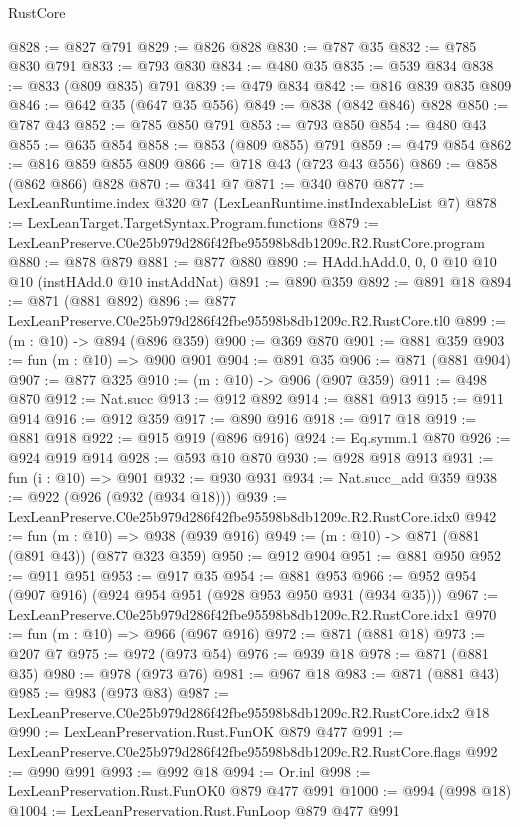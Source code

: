 \begin{lexlean}{RustCore}
\begin{coremodule}
@828 := @827 @791
@829 := @826 @828
@830 := @787 @35
@832 := @785 @830 @791
@833 := @793 @830
@834 := @480 @35
@835 := @539 @834
@838 := @833 (@809 @835) @791
@839 := @479 @834
@842 := @816 @839 @835 @809
@846 := @642 @35 (@647 @35 @556)
@849 := @838 (@842 @846) @828
@850 := @787 @43
@852 := @785 @850 @791
@853 := @793 @850
@854 := @480 @43
@855 := @635 @854
@858 := @853 (@809 @855) @791
@859 := @479 @854
@862 := @816 @859 @855 @809
@866 := @718 @43 (@723 @43 @556)
@869 := @858 (@862 @866) @828
@870 := @341 @7
@871 := @340 @870
@877 := LexLeanRuntime.index @320 @7 (LexLeanRuntime.instIndexableList @7)
@878 := LexLeanTarget.TargetSyntax.Program.functions
@879 := LexLeanPreserve.C0e25b979d286f42fbe95598b8db1209c.R2.RustCore.program
@880 := @878 @879
@881 := @877 @880
@890 := HAdd.hAdd.{0, 0, 0} @10 @10 @10 (instHAdd.{0} @10 instAddNat)
@891 := @890 @359
@892 := @891 @18
@894 := @871 (@881 @892)
@896 := @877 LexLeanPreserve.C0e25b979d286f42fbe95598b8db1209c.R2.RustCore.tl0
@899 := (m : @10) -> @894 (@896 @359)
@900 := @369 @870
@901 := @881 @359
@903 := fun (m : @10) => @900 @901
@904 := @891 @35
@906 := @871 (@881 @904)
@907 := @877 @325
@910 := (m : @10) -> @906 (@907 @359)
@911 := @498 @870
@912 := Nat.succ
@913 := @912 @892
@914 := @881 @913
@915 := @911 @914
@916 := @912 @359
@917 := @890 @916
@918 := @917 @18
@919 := @881 @918
@922 := @915 @919 (@896 @916)
@924 := Eq.symm.{1} @870
@926 := @924 @919 @914
@928 := @593 @10 @870
@930 := @928 @918 @913
@931 := fun (i : @10) => @901
@932 := @930 @931
@934 := Nat.succ_add @359
@938 := @922 (@926 (@932 (@934 @18)))
@939 := LexLeanPreserve.C0e25b979d286f42fbe95598b8db1209c.R2.RustCore.idx0
@942 := fun (m : @10) => @938 (@939 @916)
@949 := (m : @10) -> @871 (@881 (@891 @43)) (@877 @323 @359)
@950 := @912 @904
@951 := @881 @950
@952 := @911 @951
@953 := @917 @35
@954 := @881 @953
@966 := @952 @954 (@907 @916) (@924 @954 @951 (@928 @953 @950 @931 (@934 @35)))
@967 := LexLeanPreserve.C0e25b979d286f42fbe95598b8db1209c.R2.RustCore.idx1
@970 := fun (m : @10) => @966 (@967 @916)
@972 := @871 (@881 @18)
@973 := @207 @7
@975 := @972 (@973 @54)
@976 := @939 @18
@978 := @871 (@881 @35)
@980 := @978 (@973 @76)
@981 := @967 @18
@983 := @871 (@881 @43)
@985 := @983 (@973 @83)
@987 := LexLeanPreserve.C0e25b979d286f42fbe95598b8db1209c.R2.RustCore.idx2 @18
@990 := LexLeanPreservation.Rust.FunOK @879 @477
@991 := LexLeanPreserve.C0e25b979d286f42fbe95598b8db1209c.R2.RustCore.flags
@992 := @990 @991
@993 := @992 @18
@994 := Or.inl
@998 := LexLeanPreservation.Rust.FunOK0 @879 @477 @991
@1000 := @994 (@998 @18)
@1004 := LexLeanPreservation.Rust.FunLoop @879 @477 @991

\end{coremodule}
\end{lexlean}

